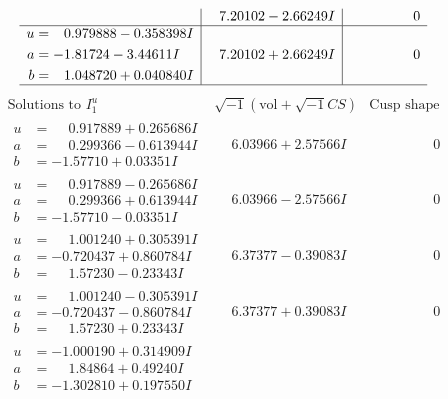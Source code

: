 \documentclass[1p]{elsarticle_modified}
\theoremstyle{definition}
\newcommand{\I}{\sqrt{-1}}
\begin{document}
$$\begin{array}{c|c|c}
 & \phantom{-}7.20102 - 2.66249 I & \phantom{-0.000000 } 0 \\ \hline\begin{aligned}
u &= \phantom{-}0.979888 - 0.358398 I \\
a &= -1.81724 - 3.44611 I \\
b &= \phantom{-}1.048720 + 0.040840 I\end{aligned}
 & \phantom{-}7.20102 + 2.66249 I & \phantom{-0.000000 } 0\\
 \hline 
 \end{array}$$\newpage$$\begin{array}{c|c|c}  
\text{Solutions to }I^u_{1}& \I (\text{vol} + \sqrt{-1}CS) & \text{Cusp shape}\\
 \hline 
\begin{aligned}
u &= \phantom{-}0.917889 + 0.265686 I \\
a &= \phantom{-}0.299366 - 0.613944 I \\
b &= -1.57710 + 0.03351 I\end{aligned}
 & \phantom{-}6.03966 + 2.57566 I & \phantom{-0.000000 } 0 \\ \hline\begin{aligned}
u &= \phantom{-}0.917889 - 0.265686 I \\
a &= \phantom{-}0.299366 + 0.613944 I \\
b &= -1.57710 - 0.03351 I\end{aligned}
 & \phantom{-}6.03966 - 2.57566 I & \phantom{-0.000000 } 0 \\ \hline\begin{aligned}
u &= \phantom{-}1.001240 + 0.305391 I \\
a &= -0.720437 + 0.860784 I \\
b &= \phantom{-}1.57230 - 0.23343 I\end{aligned}
 & \phantom{-}6.37377 - 0.39083 I & \phantom{-0.000000 } 0 \\ \hline\begin{aligned}
u &= \phantom{-}1.001240 - 0.305391 I \\
a &= -0.720437 - 0.860784 I \\
b &= \phantom{-}1.57230 + 0.23343 I\end{aligned}
 & \phantom{-}6.37377 + 0.39083 I & \phantom{-0.000000 } 0 \\ \hline\begin{aligned}
u &= -1.000190 + 0.314909 I \\
a &= \phantom{-}1.84864 + 0.49240 I \\
b &= -1.302810 + 0.197550 I\end{aligned}

\end{array}$$
\end{document}
